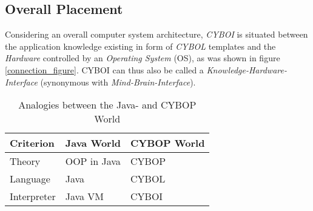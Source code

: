 %
%
%
%
%
%
%

\subsection{Overall Placement}
\label{overall_placement_heading}

Considering an overall computer system architecture, \emph{CYBOI} is situated
between the application knowledge existing in form of \emph{CYBOL} templates
and the \emph{Hardware} controlled by an \emph{Operating System} (OS), as was
shown in figure \ref{connection_figure}. CYBOI can thus also be called a
\emph{Knowledge-Hardware-Interface} (synonymous with \emph{Mind-Brain-Interface}).

\begin{table}[ht]
    \begin{center}
        \begin{footnotesize}
        \begin{tabular}{| p{35mm} | p{35mm} | p{35mm} |}
            \hline
            \textbf{Criterion} & \textbf{Java World} & \textbf{CYBOP World}\\
            \hline
            Theory & OOP in Java & CYBOP\\
            \hline
            Language & Java & CYBOL\\
            \hline
            Interpreter & Java VM & CYBOI\\
            \hline
        \end{tabular}
        \end{footnotesize}
        \caption{Analogies between the Java- and CYBOP World}
        \label{analogies_table}
    \end{center}
\end{table}


